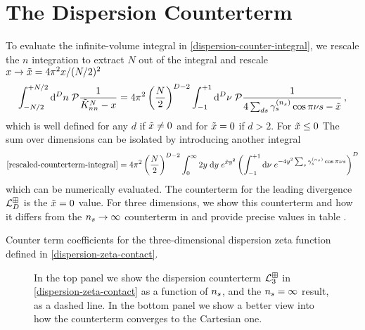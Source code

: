 \section{The Dispersion Counterterm}
\label{sec:dispersion-counterterm}

To evaluate the infinite-volume integral in \eqref{dispersion-counter-integral}, we rescale the $n$ integration to extract $N$ out of the integral and rescale  $x \to \tilde{x} = 4 \pi^2  x/(N/2)^2$
\begin{align}\label{eq:rescaled-counterterm-integral}
    \int_{-N/2}^{+N/2} \mathrm{d}^Dn\; \mathcal{P} \frac{1}{\tilde K_{nn}^N - x}
    =
    4\pi^2 \left(\frac{N}{2}\right)^{D-2} \int_{-1}^{+1} \mathrm{d}^D\nu\; \mathcal{P} \frac{1}{4\sum_{ds} \gamma^{({n_s})}_s \cos \pi \nu s - \tilde{x}}
    \, ,
\end{align}
which is well defined for any $d$ if $\tilde{x}\neq0$ and for $\tilde{x}=0$ if $d>2$.
For $\tilde{x}\leq0$ The sum over dimensions can be isolated by introducing another integral
\begin{equation}
    \label{eq:dispersion counterterm}
    \eqref{rescaled-counterterm-integral}
    =
    4 \pi^2 \left(\frac{N}{2}\right)^{D-2}\int_{0}^{\infty} 2y\; \mathrm{d}y\; e^{\xtilde y^2}\left(\int_{-1}^{+1} \mathrm{d}\nu\; e^{-4y^2 \sum_s \gamma_s^{(\nstep)} \cos \pi \nu s}\right)^D
\end{equation}
which can be numerically evaluated.
The counterterm for the leading divergence $\mathcal{L}_D^{\boxplus}$ is the $\tilde{x}=0$ value.
For three dimensions, we show this counterterm and how it differs from the ${n_s} \to \infty$ counterterm in  and provide precise values in table .
\begin{table}[htb]
    
    \caption{
    	\label{tab:diserpersion-zeta-3d-counterterm-counterterm}
		Counter term coefficients for the three-dimensional dispersion zeta function defined in \eqref{dispersion-zeta-contact}.
    }
\end{table}

\begin{figure}[htb]
    \scalebox{0.9}{}
    \caption{
    	In the top panel we show the dispersion counterterm $\mathcal{L}^{\boxplus}_{3}$ in \eqref{dispersion-zeta-contact} as a function of ${n_s}$, and the ${n_s}=\infty$ result, as a dashed line.
	In the bottom panel we show a better view into how the counterterm converges to the Cartesian one.
    }
    \label{fig:nstep counterterm}
\end{figure}

